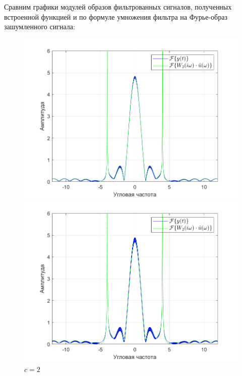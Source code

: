 \documentclass[a4paper]{article}
\begin{document}
Сравним графики модулей образов фильтрованных сигналов, полученных встроенной функцией и по формуле умножения фильтра на Фурье-образ зашумленного сигнала:

\begin{figure}[H]
    \begin{minipage}{0.5\textwidth}
        \centering
        \includegraphics[width=\linewidth]{ex1_2/приближение/a1=0_a2=25_b1=10.5_b2=25_d=4_c=1/h5.png}
        \caption{$c=1$}
    \end{minipage}
    \begin{minipage}{0.5\textwidth}
        \centering
        \includegraphics[width=\linewidth]{ex1_2/приближение/a1=0_a2=25_b1=10.5_b2=25_d=4_c=2/h5.png}
        \caption{$c=2$}
    \end{minipage}
\end{figure}
\end{document}
